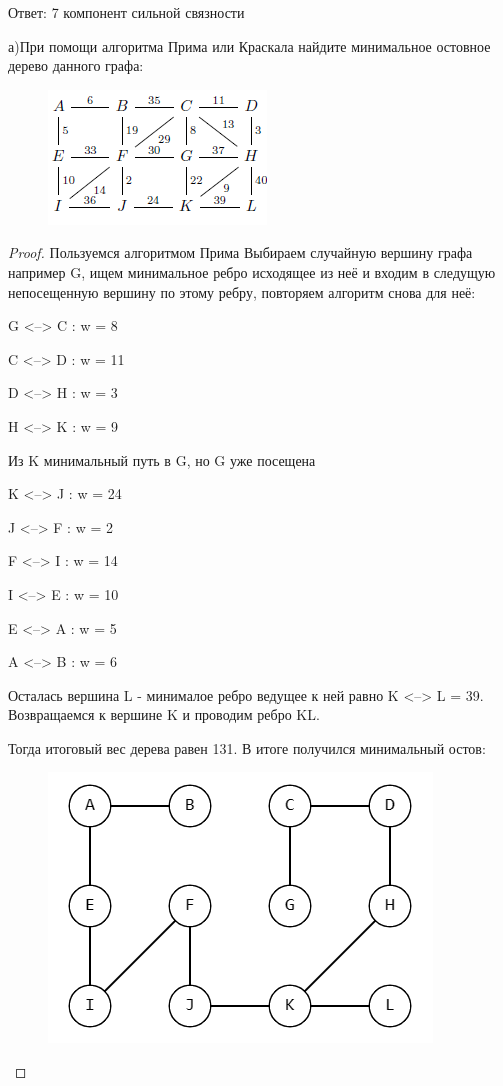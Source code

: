 Ответ: 7 компонент сильной связности

\begin{problem}[16]
	а)При помощи алгоритма Прима или Краскала найдите минимальное остовное дерево данного графа:\\
    \begin{figure}[h]
    \centering
     \includegraphics[width=0.35\linewidth]{pics/Graph16th.png}
     \label{fig:dm}
    \end{figure}
    
\end{problem}

\begin{proof}
    Пользуемся алгоритмом Прима
    Выбираем случайную вершину графа например G, ищем минимальное ребро исходящее из неё и входим в следущую непосещенную вершину по этому ребру, повторяем алгоритм снова для неё:   

    G <--> C : w = 8

    C <--> D : w = 11 

    D <--> H : w = 3 

    H <--> K : w = 9
    
    Из K минимальный путь в G, но G уже посещена
    
    K <--> J : w = 24

    J <--> F : w = 2

    F <--> I : w = 14

    I <--> E : w = 10

    E <--> A : w = 5

    A <--> B : w = 6

   Осталась вершина L - минималое ребро ведущее к ней равно K <--> L = 39. Возвращаемся к вершине K и проводим ребро KL.

    Тогда итоговый вес дерева равен 131. В итоге получился минимальный остов:

    \begin{figure}[h]
    \centering
     \includegraphics[width=0.35\linewidth]{pics/16th_a_solution.png}
     \label{fig:dm}
    \end{figure}
\end{proof}
